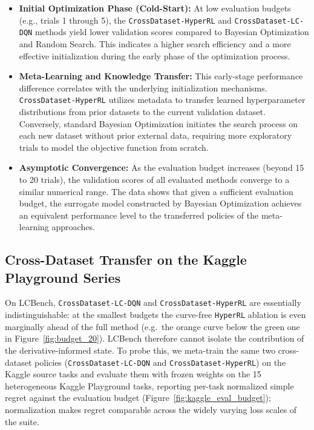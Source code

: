 \begin{itemize}
    \item \textbf{Initial Optimization Phase (Cold-Start):} At low evaluation budgets (e.g., trials 1 through 5), the \texttt{CrossDataset-HyperRL} and \texttt{CrossDataset-LC-DQN} methods yield lower validation scores compared to Bayesian Optimization and Random Search. This indicates a higher search efficiency and a more effective initialization during the early phase of the optimization process.
    \item \textbf{Meta-Learning and Knowledge Transfer:} This early-stage performance difference correlates with the underlying initialization mechanisms. \texttt{CrossDataset-HyperRL} utilizes metadata to transfer learned hyperparameter distributions from prior datasets to the current validation dataset. Conversely, standard Bayesian Optimization initiates the search process on each new dataset without prior external data, requiring more exploratory trials to model the objective function from scratch.
    \item \textbf{Asymptotic Convergence:} As the evaluation budget increases (beyond 15 to 20 trials), the validation scores of all evaluated methods converge to a similar numerical range. The data shows that given a sufficient evaluation budget, the surrogate model constructed by Bayesian Optimization achieves an equivalent performance level to the transferred policies of the meta-learning approaches.
\end{itemize}

\subsection{Cross-Dataset Transfer on the Kaggle Playground Series}
\label{section:exp:kaggle}

On LCBench, \texttt{CrossDataset-LC-DQN} and \texttt{CrossDataset-HyperRL} are essentially indistinguishable: at the smallest budgets the curve-free \texttt{HyperRL} ablation is even marginally ahead of the full method (e.g.\ the orange curve below the green one in Figure~\ref{fig:budget_20}). LCBench therefore cannot isolate the contribution of the derivative-informed state. To probe this, we meta-train the same two cross-dataset policies (\texttt{CrossDataset-LC-DQN} and \texttt{CrossDataset-HyperRL}) on the Kaggle source tasks and evaluate them with frozen weights on the 15 heterogeneous Kaggle Playground tasks, reporting per-task normalized simple regret against the evaluation budget (Figure~\ref{fig:kaggle_eval_budget}); normalization makes regret comparable across the widely varying loss scales of the suite.

